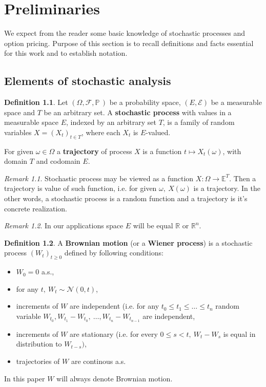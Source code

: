 \documentclass[a4paper,12pt, oneside]{book}
\theoremstyle{definition}
\newtheorem{mydef}{Definition}[chapter]
\theoremstyle{remark}
\newtheorem{remark}{Remark}[chapter]
\def\P{{\mathbb{P}}\,}
\def\R{{\mathbb{R}}}
\begin{document}
\chapter{Preliminaries}
We expect from the reader some basic knowledge of stochastic processes and option pricing. Purpose of this section is to recall definitions and facts essential for this work and to establish notation.

\section{Elements of stochastic analysis}
\begin{mydef}
 Let $(\Omega, \mathcal{F}, \P)$ be a probability space, $(E, \mathcal{E})$ be a measurable space and $T$ be an arbitrary set. A \textbf{stochastic process} with values in a measurable space $E$, indexed by an arbitrary set $T$, is a family of random variables $X = (X_t)_{t \in T}$, where each $X_t$ is $E$-valued.
 
 For given $\omega \in \Omega$ a \textbf{trajectory} of process $X$ is a function $t \mapsto X_t(\omega)$, with domain $T$ and codomain $E$.
\end{mydef}

\begin{remark}
 Stochastic process may be viewed as a function $X: \Omega \rightarrow \mathbb{E}^T$. Then a trajectory is value of such function, i.e. for given $\omega,\ X(\omega)$ is a trajectory. In the other words, a stochastic process is a random function and a trajectory is it's concrete realization.
\end{remark}

\begin{remark}
 In our applications space $E$ will be equal $\R$ or $\R^n$. 
\end{remark}

\begin{mydef}
 A \textbf{Brownian motion} (or a \textbf{Wiener process}) is a stochastic process $(W_t)_{t \geq 0}$ defined by following conditions:
 \begin{itemize}
  \item $W_0 = 0$ a.s.,
  \item for any $t,\ W_t \sim \mathcal{N}(0,t)$,
  \item increments of $W$ are independent (i.e. for any $t_0 \leq t_1 \leq \ldots \leq t_n$ random variable $W_{t_0}, W_{t_1} - W_{t_0},\ \ldots, W_{t_n} - W_{t_{n-1}}$ are independent,
  \item increments of $W$ are stationary (i.e. for every $0 \leq s < t,\ W_t-W_s$ is equal in distribution to $W_{t-s})$,
  \item trajectories of $W$ are continous a.s.
 \end{itemize}
\end{mydef}
\noindent In this paper $W$ will always denote Brownian motion.
\end{document}
